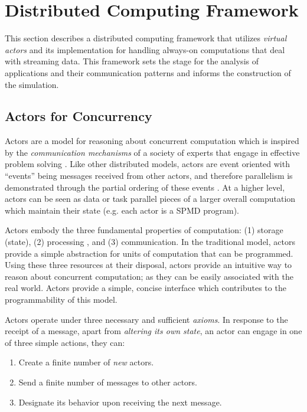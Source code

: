\documentclass[draftclsnofoot,onecolumn,conference,11pt]{IEEEtran}
\begin{document}
\section{Distributed Computing Framework}

This section describes a distributed computing framework that utilizes \textit{virtual actors} and its implementation for handling always-on computations that deal with streaming data. This framework sets the stage for the analysis of applications and their communication patterns and informs the construction of the simulation.

\subsection{Actors for Concurrency}

Actors are a model for reasoning about concurrent computation which is inspired by the \textit{communication mechanisms} of a society of experts that engage in effective problem solving \cite{hewitt_viewing_1977}.  Like other distributed models, actors are event oriented with ``events'' being messages received from other actors, and therefore parallelism is demonstrated through the partial ordering of these events \cite{agha_actors:_1985}. At a higher level, actors can be seen as data or task parallel pieces of a larger overall computation which maintain their state (e.g. each actor is a SPMD program).

Actors embody the three fundamental properties of computation: (1) storage (state), (2) processing , and (3) communication. In the traditional model, actors provide a simple abstraction for units of computation that can be programmed. Using these three resources at their disposal, actors provide an intuitive way to reason about concurrent computation; as they can be easily associated with the real world. Actors provide a simple, concise interface which contributes to the programmability of this model.

Actors operate under three necessary and sufficient \textit{axioms}. In response to the receipt of a message, apart from \textit{altering its own state}, an actor can engage in one of three simple actions, they can:

\begin{enumerate}
    \item Create a finite number of \textit{new} actors.
    \item Send a finite number of messages to other actors.
    \item Designate its behavior upon receiving the next message.
\end{enumerate}
\end{document}

